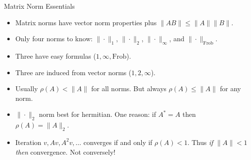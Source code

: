 \documentclass{amsart}
\newcommand{\alert}[1]{{\color{red} #1}}
\begin{document}
\Huge
\centerline{Matrix Norm Essentials}

\thispagestyle{empty}

\bigskip\bigskip\bigskip\bigskip\bigskip
\LARGE
\begin{itemize}
\setlength\itemsep{2em}
\item Matrix norms have vector norm \alert{properties} plus $\|A B\|\le \|A\|\|B\|$.
\item Only \alert{four} norms to know: $\|\cdot\|_1$, $\|\cdot\|_2$, $\|\cdot\|_\infty$, and $\|\cdot\|_{\mathrm{Frob}}$.
\item Three have easy \alert{formulas} ($1,\infty,\mathrm{Frob}$).
\item Three are \alert{induced} from vector norms ($1,2,\infty$).
\item \alert{Usually} $\rho(A)<\|A\|$ for all norms.  But \alert{always} $\rho(A)\le \|A\|$ for any norm.
\item $\|\cdot\|_2$ norm best for \alert{hermitian}.  One reason: if $A^*=A$ then $\rho(A)=\|A\|_2$.
\item \alert{Iteration} $v, Av, A^2v, \dots$ converges if and only if $\rho(A)<1$.  Thus \emph{if} $\|A\|<1$ \emph{then} convergence.  Not conversely!
\end{itemize}
\end{document}
